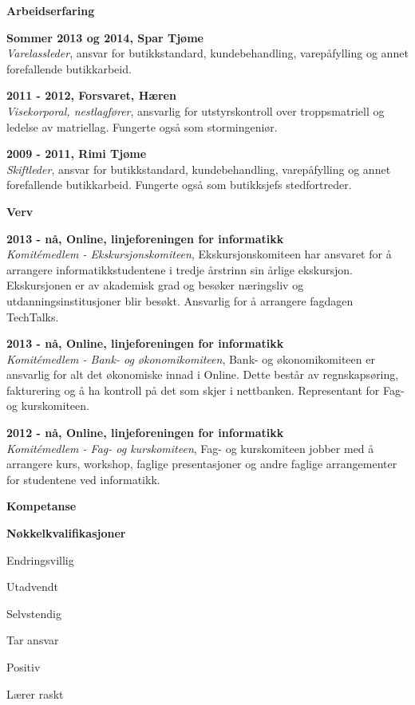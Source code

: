 \documentclass[a4paper,12pt,final]{memoir}
\newcommand{\Sep}{\vspace{1.5em}}
\newcommand{\SmallSep}{\vspace{0.5em}}
\newcommand{\CVSection}[1]
	{\Large\textbf{#1}\par
	\SmallSep\normalsize\normalfont}
\newcommand{\CVItem}[1]
	{\textbf{\color{RoyalBlue} #1}}
\begin{document}
\CVSection{Arbeidserfaring}
\CVItem{Sommer 2013 og 2014, Spar Tjøme}\\
\textit{Varelassleder}, ansvar for butikkstandard, kundebehandling, varepåfylling og annet forefallende butikkarbeid.
\SmallSep

\CVItem{2011 - 2012, Forsvaret, Hæren}\\
\textit{Visekorporal, nestlagfører}, ansvarlig for utstyrskontroll over troppsmatriell og ledelse av matriellag. Fungerte også som stormingeniør.
\SmallSep

\CVItem{2009 - 2011, Rimi Tjøme}\\
\textit{Skiftleder}, ansvar for butikkstandard, kundebehandling, varepåfylling og annet forefallende butikkarbeid. Fungerte også som butikksjefs stedfortreder.
\Sep

\CVSection{Verv}
\CVItem{2013 - nå, Online, linjeforeningen for informatikk}\\
\textit{Komitémedlem - Ekskursjonskomiteen}, Ekskursjonskomiteen har ansvaret for å arrangere informatikkstudentene i tredje årstrinn sin årlige ekskursjon. Ekskursjonen er av akademisk grad og besøker næringsliv og utdanningsinstitusjoner blir besøkt. Ansvarlig for å arrangere fagdagen TechTalks. 
\SmallSep

\CVItem{2013 - nå, Online, linjeforeningen for informatikk}\\
\textit{Komitémedlem - Bank- og økonomikomiteen}, Bank- og økonomikomiteen er ansvarlig for alt det økonomiske innad i Online. Dette består av regnskapsøring, fakturering og å ha kontroll på det som skjer i nettbanken. Representant for Fag- og kurskomiteen.
\SmallSep

\CVItem{2012 - nå, Online, linjeforeningen for informatikk}\\
\textit{Komitémedlem - Fag- og kurskomiteen}, Fag- og kurskomiteen jobber med å arrangere kurs, workshop, faglige presentasjoner og andre faglige arrangementer for studentene ved informatikk.
\Sep

\clearpage
\framebreak
\framebreak

\CVSection{Kompetanse}

\CVItem{Nøkkelkvalifikasjoner}
\begin{multicols}{3}
\begin{compactitem}[\color{RoyalBlue}$\circ$]
    \item Endringsvillig 
    \item Utadvendt
    \item Selvstendig
    \item Tar ansvar
    \item Positiv
    \item Lærer raskt
\end{compactitem}
\end{multicols}
\SmallSep
\end{document}
